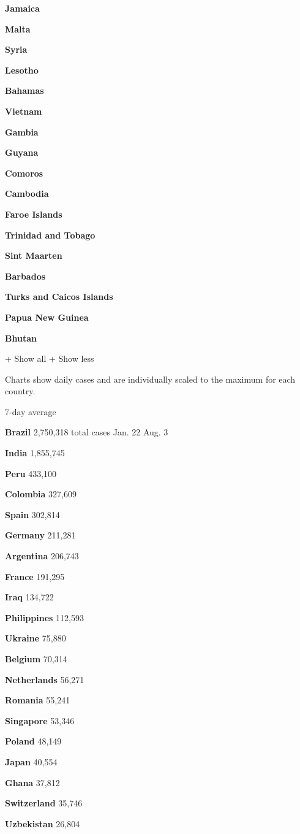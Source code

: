 \textbf{Jamaica}

\textbf{Malta}

\textbf{Syria}

\textbf{Lesotho}

\textbf{Bahamas}

\textbf{Vietnam}

\textbf{Gambia}

\textbf{Guyana}

\textbf{Comoros}

\textbf{Cambodia}

\textbf{Faroe Islands}

\textbf{Trinidad and Tobago}

\textbf{Sint Maarten}

\textbf{Barbados}

\textbf{Turks and Caicos Islands}

\textbf{Papua New Guinea}

\textbf{Bhutan}

+ Show all + Show less

Charts show daily cases and are individually scaled to the maximum for
each country.

7-day average

\textbf{Brazil} 2,750,318 total cases Jan. 22 Aug. 3

\textbf{India} 1,855,745

\textbf{Peru} 433,100

\textbf{Colombia} 327,609

\textbf{Spain} 302,814

\textbf{Germany} 211,281

\textbf{Argentina} 206,743

\textbf{France} 191,295

\textbf{Iraq} 134,722

\textbf{Philippines} 112,593

\textbf{Ukraine} 75,880

\textbf{Belgium} 70,314

\textbf{Netherlands} 56,271

\textbf{Romania} 55,241

\textbf{Singapore} 53,346

\textbf{Poland} 48,149

\textbf{Japan} 40,554

\textbf{Ghana} 37,812

\textbf{Switzerland} 35,746

\textbf{Uzbekistan} 26,804

